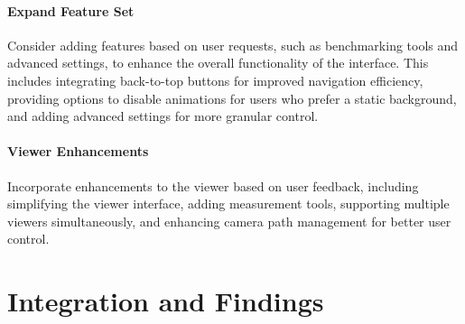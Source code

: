 \paragraph{Expand Feature Set}
Consider adding features based on user requests, such as benchmarking tools and advanced settings, to enhance the overall functionality of the interface. This includes integrating back-to-top buttons for improved navigation efficiency, providing options to disable animations for users who prefer a static background, and adding advanced settings for more granular control.

\paragraph{Viewer Enhancements}
Incorporate enhancements to the viewer based on user feedback, including simplifying the viewer interface, adding measurement tools, supporting multiple viewers simultaneously, and enhancing camera path management for better user control.

\section{Integration and Findings}
\label{sec:result:findings}

